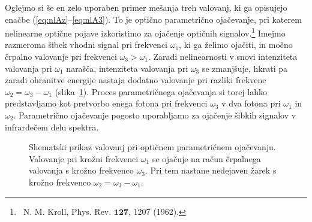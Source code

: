 Oglejmo si še en zelo uporaben primer mešanja treh valovanj, 
ki ga opisujejo enačbe (\ref{eq:nlAz}--\ref{eq:nlA3}). To je
optično parametrično ojačevanje, pri katerem nelinearne optične pojave
izkoristimo za ojačenje optičnih signalov.\footnote{~N. M. Kroll, Phys. Rev. $\mathbf{127}$, 1207 (1962).}
Imejmo razmeroma šibek vhodni
signal pri frekvenci $\omega_{1}$, ki ga želimo ojačiti, in močno črpalno valovanje
pri frekvenci $\omega_{3}>\omega_{1}$. Zaradi nelinearnosti v snovi  
intenziteta valovanja pri $\omega_{1}$ narašča, 
intenziteta valovanja pri $\omega_{3}$ se zmanjšuje, hkrati pa zaradi
ohranitve energije nastaja dodatno valovanje pri razliki frekvenc
$\omega_{2}=\omega_{3}-\omega_{1}$ (slika~\ref{fig:opa2}). Proces parametričnega ojačevanja 
si torej lahko predstavljamo kot pretvorbo enega fotona pri frekvenci 
$\omega_{3}$ v dva fotona pri $\omega_{1}$ in $\omega_{2}$.
Parametrično ojačevanje pogosto uporabljamo za ojačenje šibkih signalov 
v infrardečem delu spektra.
\begin{figure}[ht]
\centering
\def\svgwidth{70truemm} 

\caption{Shematski prikaz valovanj pri optičnem parametričnem ojačevanju. Valovanje
pri krožni frekvenci $\omega_1$ se ojačuje na račun črpalnega valovanja s krožno frekvenco
$\omega_3$. Pri tem nastane nedejaven žarek s krožno frekvenco $\omega_2 =  \omega_3-\omega_1$.}
\label{fig:opa2}
\end{figure}

